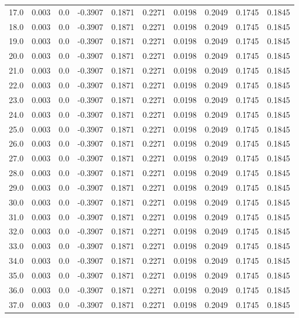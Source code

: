 \begin{longtable}{lrrrrrrrrr}
17.0 & 0.003 & 0.0 & -0.3907 & 0.1871 & 0.2271 & 0.0198 & 0.2049 & 0.1745 & 0.1845 \\
18.0 & 0.003 & 0.0 & -0.3907 & 0.1871 & 0.2271 & 0.0198 & 0.2049 & 0.1745 & 0.1845 \\
19.0 & 0.003 & 0.0 & -0.3907 & 0.1871 & 0.2271 & 0.0198 & 0.2049 & 0.1745 & 0.1845 \\
20.0 & 0.003 & 0.0 & -0.3907 & 0.1871 & 0.2271 & 0.0198 & 0.2049 & 0.1745 & 0.1845 \\
21.0 & 0.003 & 0.0 & -0.3907 & 0.1871 & 0.2271 & 0.0198 & 0.2049 & 0.1745 & 0.1845 \\
22.0 & 0.003 & 0.0 & -0.3907 & 0.1871 & 0.2271 & 0.0198 & 0.2049 & 0.1745 & 0.1845 \\
23.0 & 0.003 & 0.0 & -0.3907 & 0.1871 & 0.2271 & 0.0198 & 0.2049 & 0.1745 & 0.1845 \\
24.0 & 0.003 & 0.0 & -0.3907 & 0.1871 & 0.2271 & 0.0198 & 0.2049 & 0.1745 & 0.1845 \\
25.0 & 0.003 & 0.0 & -0.3907 & 0.1871 & 0.2271 & 0.0198 & 0.2049 & 0.1745 & 0.1845 \\
26.0 & 0.003 & 0.0 & -0.3907 & 0.1871 & 0.2271 & 0.0198 & 0.2049 & 0.1745 & 0.1845 \\
27.0 & 0.003 & 0.0 & -0.3907 & 0.1871 & 0.2271 & 0.0198 & 0.2049 & 0.1745 & 0.1845 \\
28.0 & 0.003 & 0.0 & -0.3907 & 0.1871 & 0.2271 & 0.0198 & 0.2049 & 0.1745 & 0.1845 \\
29.0 & 0.003 & 0.0 & -0.3907 & 0.1871 & 0.2271 & 0.0198 & 0.2049 & 0.1745 & 0.1845 \\
30.0 & 0.003 & 0.0 & -0.3907 & 0.1871 & 0.2271 & 0.0198 & 0.2049 & 0.1745 & 0.1845 \\
31.0 & 0.003 & 0.0 & -0.3907 & 0.1871 & 0.2271 & 0.0198 & 0.2049 & 0.1745 & 0.1845 \\
32.0 & 0.003 & 0.0 & -0.3907 & 0.1871 & 0.2271 & 0.0198 & 0.2049 & 0.1745 & 0.1845 \\
33.0 & 0.003 & 0.0 & -0.3907 & 0.1871 & 0.2271 & 0.0198 & 0.2049 & 0.1745 & 0.1845 \\
34.0 & 0.003 & 0.0 & -0.3907 & 0.1871 & 0.2271 & 0.0198 & 0.2049 & 0.1745 & 0.1845 \\
35.0 & 0.003 & 0.0 & -0.3907 & 0.1871 & 0.2271 & 0.0198 & 0.2049 & 0.1745 & 0.1845 \\
36.0 & 0.003 & 0.0 & -0.3907 & 0.1871 & 0.2271 & 0.0198 & 0.2049 & 0.1745 & 0.1845 \\
37.0 & 0.003 & 0.0 & -0.3907 & 0.1871 & 0.2271 & 0.0198 & 0.2049 & 0.1745 & 0.1845 \\

\end{longtable}
